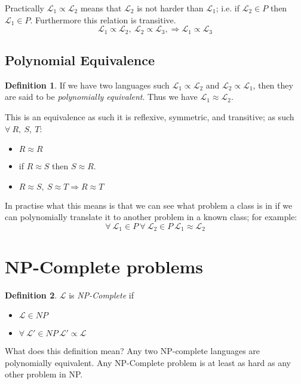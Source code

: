 \documentclass{article}
\theoremstyle{definition}
\newtheorem{definition}{Definition}[section]
\begin{document}
Practically $\mathcal{L_1} \propto \mathcal{L_2}$ means that
$\mathcal{L_2}$ is not harder than $\mathcal{L_1}$;
i.e. if $\mathcal{L_2} \in P$ then $\mathcal{L_1} \in P$.
Furthermore this relation is transitive.
$$
  \mathcal{L_1} \propto \mathcal{L_2},\ 
  \mathcal{L_2} \propto \mathcal{L_3},\Rightarrow
  \mathcal{L_1} \propto \mathcal{L_3}
$$

\subsection{Polynomial Equivalence}
\begin{definition}
	If we have two languages such $\mathcal{L_1} \propto \mathcal{L_2}$ and
	$\mathcal{L_2} \propto \mathcal{L_1}$, then they are said to be \textit{polynomially equivalent}.
	Thus we have $\mathcal{L_1} \approx \mathcal{L_2}$.
\end{definition}
This is an equivalence as such it is reflexive, symmetric, and transitive;
as such $\forall\ R,\ S,\ T$:
\begin{itemize}
    \item $R \approx R$
    \item if $R \approx S$ then $S \approx R$.
    \item $
		R \approx S,\ 
		S \approx T \Rightarrow
		R \approx T
	$
\end{itemize}

In practise what this means is that we can see what problem a class is in if we can
polynomially translate it to another problem in a known class; for example:
$$
  \forall\ \mathcal{L_1} \in P\ 
  \forall\ \mathcal{L_2} \in P\ 
  \mathcal{L_1} \approx \mathcal{L_2}
$$

\section{NP-Complete problems}
\begin{definition}
	$\mathcal{L}$ is \textit{NP-Complete} if
	\begin{itemize}
		\item $\mathcal{L} \in NP$
		\item $\forall\ \mathcal{L\prime} \in NP\ \mathcal{L\prime} \propto \mathcal{L}$
	\end{itemize}
\end{definition}

What does this definition mean?
Any two NP-complete languages are polynomially equivalent.
Any NP-Complete problem is at least as hard as any other problem in NP.
\end{document}
